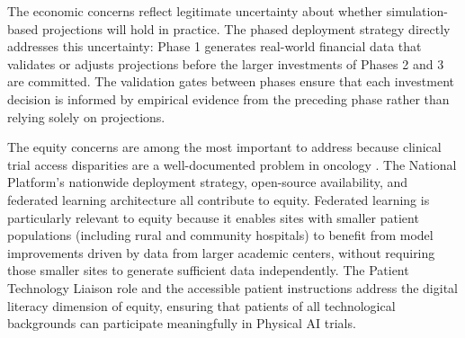The economic concerns reflect legitimate uncertainty about whether simulation-
based projections will hold in practice. The phased deployment strategy
directly addresses this uncertainty: Phase 1 generates real-world financial
data that validates or adjusts projections before the larger investments of
Phases 2 and 3 are committed. The validation gates between phases ensure that
each investment decision is informed by empirical evidence from the preceding
phase rather than relying solely on projections.

The equity concerns are among the most important to address because clinical
trial access disparities are a well-documented problem in oncology
\cite{nci-clinical-trials}. The National Platform's nationwide deployment
strategy, open-source availability, and federated learning architecture all
contribute to equity. Federated learning is particularly relevant to equity
because it enables sites with smaller patient populations (including rural and
community hospitals) to benefit from model improvements driven by data from
larger academic centers, without requiring those smaller sites to generate
sufficient data independently. The Patient Technology Liaison role and the
accessible patient instructions \cite{patient-instructions-paper} address the
digital literacy dimension of equity, ensuring that patients of all
technological backgrounds can participate meaningfully in Physical AI trials.
